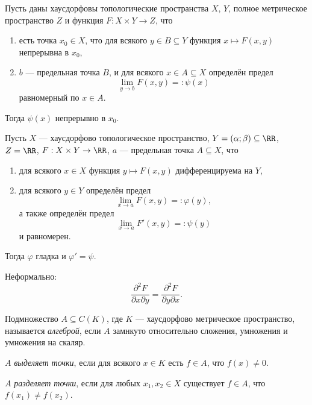 \documentclass[12pt,a4paper]{article}
\begin{document}
    \begin{theorem}
        Пусть даны хаусдорфовы топологические пространства $X$, $Y$, полное метрическое пространство $Z$ и функция $F: X \times Y \to Z$, что
        \begin{enumerate}
            \item есть точка $x_0 \in X$, что для всякого $y \in B \subseteq Y$ функция $x \mapsto F(x, y)$ непрерывна в $x_0$,
            \item $b$ --- предельная точка $B$, и для всякого $x \in A \subseteq X$ определён предел
                \[\lim_{y \to b} F(x, y) =: \psi(x)\]
                равномерный по $x \in A$.
        \end{enumerate}
        Тогда $\psi(x)$ непрерывно в $x_0$.
    \end{theorem}

    \begin{theorem}
        Пусть $X$ --- хаусдорфово топологическое пространство, $Y = (\alpha; \beta) \subseteq \RR$, $Z = \RR$, $F: X \times Y \to \RR$, $a$ --- предельная точка $A \subseteq X$, что
        \begin{enumerate}
            \item для всякого $x \in X$ функция $y \mapsto F(x, y)$ дифференцируема на $Y$,
            \item для всякого $y \in Y$ определён предел
                \[\lim_{x \to a} F(x, y) =: \varphi(y),\]
                а также определён предел
                \[\lim_{x \to a} F'(x, y) =: \psi(y)\]
                и равномерен.
        \end{enumerate}
        Тогда $\varphi$ гладка и $\varphi' = \psi$.
    \end{theorem}

    \begin{theorem}
        Неформально:
        \[\frac{\partial^2 F}{\partial x \partial y} = \frac{\partial^2 F}{\partial y \partial x}.\]
    \end{theorem}

    \begin{definition}
        Подмножество $A \subseteq C(K)$, где $K$ --- хаусдорфово метрическое пространство, называется \emph{алгеброй}, если $A$ замнкуто относительно сложения, умножения и умножения на скаляр.

        $A$ \emph{выделяет точки}, если для всякого $x \in K$ есть $f \in A$, что $f(x) \neq 0$.

        $A$ \emph{разделяет точки}, если для любых $x_1, x_2 \in X$ существует $f \in A$, что $f(x_1) \neq f(x_2)$.
    \end{definition}
\end{document}
